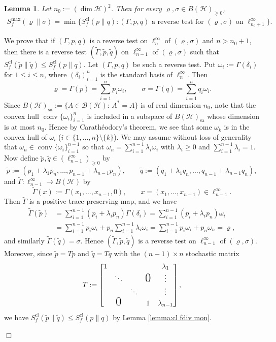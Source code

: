 \documentclass[unsortedaddress,superscriptaddress,pra,notitlepage]{revtex4}
\newtheorem{lemma}[definition]{Lemma}
\newenvironment{proof}[1][Proof]{\begin{trivlist}
\item[\hskip \labelsep {\bfseries #1}]}{\hfill$\Box$\end{trivlist}}
\def\B{{\mathcal B}}
\def\rho{\varrho}
\def\hil{{\mathcal H}}
\def\pne{_{\gneq 0}}
\def\sa{\mathrm{sa}}
\def\cl{\mathrm{cl}}
\def\cH{\mathcal{H}}
\def\cl{\mathrm{cl}}
\DeclareMathOperator{\conv}{conv}
\begin{document}
\begin{lemma}\label{L-8}
Let $n_0:=(\dim\cH)^2$. Then for every $\rho,\sigma\in B(\cH)\pne$,
\begin{align}\label{F-3}
S_f^{\max}(\rho\|\sigma)=\min\bigl\{S_f^\cl(p\|q):
\mbox{$(\Gamma,p,q)$ a reverse test for $(\rho,\sigma)$ on $\ell_{n_0+1}^\infty$}\bigr\}.
\end{align}
\end{lemma}

\begin{proof}
We prove that if $(\Gamma,p,q)$ is a reverse test on $\ell_n^\infty$ of $(\rho,\sigma)$ and
$n>n_0+1$, then there is a reverse test $(\tilde\Gamma,\tilde p,\tilde q)$ on $\ell_{n-1}^\infty$
of $(\rho,\sigma)$ such that $S_f^\cl(\tilde p\|\tilde q)\le S_f^\cl(p\|q)$. Let $(\Gamma,p,q)$
be such a reverse test. Put $\omega_i:=\Gamma(\delta_i)$ for $1\le i\le n$, where
$(\delta_i)_{i=1}^n$ is the standard basis of $\ell_n^\infty$. Then
\[
\rho=\Gamma(p)=\sum_{i=1}^np_i\omega_i,\qquad
\sigma=\Gamma(q)=\sum_{i=1}^nq_i\omega_i.
\]
Since $B(\cH)_{\sa}:=\{A\in\B(\hil):\,A^*=A\}$ is of real dimension $n_0$, note that the convex hull
$\conv\{\omega_i\}_{i=1}^n$ is included in a subspace of $B(\cH)_{\sa}$ whose dimension is
at most $n_0$. Hence by Carath\'eodory's theorem, we see that some $\omega_k$ is in the
convex hull of $\omega_i$ ($i\in\{1,\dots,n\}\setminus\{k\}$). We may assume without loss of
generality that $\omega_n\in\conv\{\omega_i\}_{i=1}^{n-1}$ so that
$\omega_n=\sum_{i=1}^{n-1}\lambda_i\omega_i$ with $\lambda_i\ge0$ and
$\sum_{i=1}^{n-1}\lambda_i=1$. Now define $\tilde p,\tilde q\in(\ell_{n-1}^\infty)\pne$ by
\[
\tilde p:=(p_1+\lambda_1p_n,\ldots,p_{n-1}+\lambda_{n-1}p_n),\qquad
\tilde q:=(q_1+\lambda_1q_n,\ldots,q_{n-1}+\lambda_{n-1}q_n),
\]
and $\tilde\Gamma:\ell_{n-1}^\infty\to B(\cH)$ by
\[
\tilde\Gamma(x):=\Gamma(x_1,\dots,x_{n-1},0),
\qquad x=(x_1,\dots,x_{n-1})\in\ell_{n-1}^\infty.
\]
Then $\tilde\Gamma$ is a positive trace-preserving map, and we have
\begin{align*}
\tilde\Gamma(\tilde p)&=\sum_{i=1}^{n-1}(p_i+\lambda_ip_n)\Gamma(\delta_i)
=\sum_{i=1}^{n-1}(p_i+\lambda_ip_n)\omega_i \\
&=\sum_{i=1}^{n-1}p_i\omega_i+p_n\sum_{i=1}^{n-1}\lambda_i\omega_i
=\sum_{i=1}^{n-1}p_i\omega_i+p_n\omega_n=\rho,
\end{align*}
and similarly $\tilde\Gamma(\tilde q)=\sigma$. Hence $(\tilde\Gamma,\tilde p,\tilde q)$ is a
reverse test on $\ell_{n-1}^\infty$ of $(\rho,\sigma)$. Moreover, since $\tilde p=T p$ and
$\tilde q=T q$ with the $(n-1)\times n$ stochastic matrix
\[
T:=\begin{bmatrix}1&&&&\lambda_1\\
&\ddots&&\mbox{\LARGE$0$}&\vdots \\
&&\ddots&&\vdots \\
&\mbox{\LARGE$0$}&&1&\lambda_{n-1}\end{bmatrix},
\]
we have $S_f^\cl(\tilde p\|\tilde q)\le S_f^\cl(p\|q)$ by Lemma \ref{lemma:cl fdiv mon}.


\end{proof}
\end{document}
